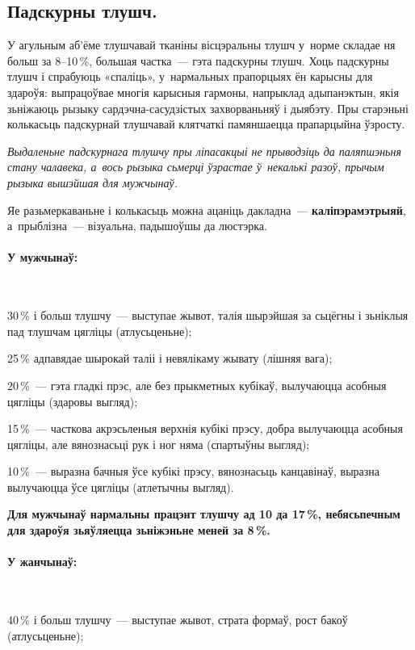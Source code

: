 \subsection*{Падскурны тлушч.} 
У агульным аб'ёме тлушчавай тканіны вісцэральны тлушч у~норме складае ня больш за 8--10\,\%, большая частка~--- гэта падскурны тлушч. Хоць падскурны тлушч і спрабуюць «спаліць», у~нармальных прапорцыях ён карысны для здароўя: выпрацоўвае многія карысныя гармоны, напрыклад адыпанэктын, якія зьніжаюць рызыку сардэчна-сасудзістых захворваньняў і дыябэту. Пры старэньні колькасьць падскурнай тлушчавай клятчаткі памяншаецца прапарцыйна ўзросту.

\emph{Выдаленьне падскурнага тлушчу пры ліпасакцыі не прыводзіць да паляпшэньня стану чалавека, а~вось рызыка сьмерці ўзрастае ў~некалькі разоў, прычым рызыка вышэйшая для мужчынаў.}

Яе разьмеркаваньне і колькасьць можна ацаніць дакладна~--- \textbf{каліпэрамэтрыяй}, а~прыблізна~--- візуальна, падышоўшы да люстэрка.

\paragraph{У мужчынаў:}~

30\,\% і больш тлушчу~--- выступае жывот, талія шырэйшая за сьцёгны і зьніклыя пад тлушчам цягліцы (атлусьценьне);

25\,\% адпавядае шырокай таліі і невялікаму жывату (лішняя вага);

20\,\%~--- гэта гладкі прэс, але без прыкметных кубікаў, вылучаюцца асобныя цягліцы (здаровы выгляд);

15\,\%~--- часткова акрэсьленыя верхнія кубікі прэсу, добра вылучаюцца асобныя цягліцы, але вянознасьці рук і ног няма (спартыўны выгляд);

10\,\%~--- выразна бачныя ўсе кубікі прэсу, вянознасьць канцавінаў, выразна вылучаюцца ўсе цягліцы (атлетычны выгляд).

\textbf{Для мужчынаў нармальны працэнт тлушчу ад 10 да 17\,\%, небясьпечным для здароўя зьяўляецца зьніжэньне меней за 8\,\%.}

\paragraph{У жанчынаў:}~

40\,\% і больш тлушчу~--- выступае жывот, страта формаў, рост бакоў (атлусьценьне);


